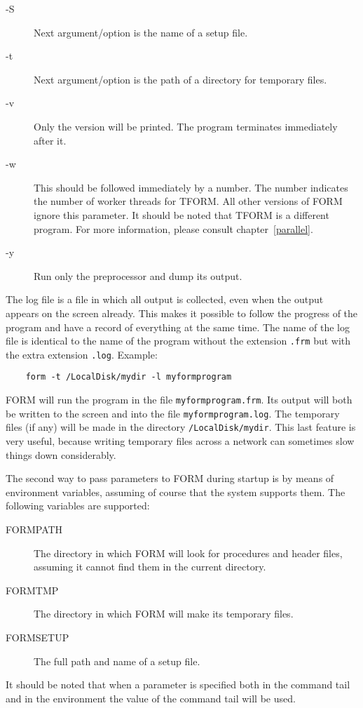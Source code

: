 \begin{description}
\item[-S] Next argument/option is the name of a setup file.
\item[-t] Next argument/option is the path of a directory for temporary files.
\item[-v] Only the version will be printed. The program terminates 
     immediately after it.
\item[-w] This should be followed immediately by a number. The 
     number indicates the number of worker threads for TFORM. All other 
     versions of FORM ignore this parameter. It should be noted that TFORM 
     is a different program. For more information, please consult 
     chapter~\ref{parallel}.
\item[-y] Run only the preprocessor and dump its output.
\end{description}

\noindent The log file is a file in which all 
output is collected, even when the output appears on the screen already. 
This makes it possible to follow the progress of the program and have a 
record of everything at the same time. The name of the log file is 
identical to the name of the program without the extension \verb:.frm: but 
with the extra extension \verb:.log:.
Example:
\begin{center}
\begin{verbatim}
	form -t /LocalDisk/mydir -l myformprogram
\end{verbatim}
\end{center}
FORM will run the program in the file \verb:myformprogram.frm:. Its output 
will both be written to the screen and into the file 
\verb:myformprogram.log:. The temporary files (if any) will be made in the 
directory \verb:/LocalDisk/mydir:. This last feature is very useful, 
because writing temporary files across a network can sometimes slow things 
down considerably.

The second way to pass parameters to FORM during startup is by means of 
environment variables, assuming of course that 
the system supports them. The following variables are supported:
\begin{description}
\item[FORMPATH] The directory in which FORM will look for 
procedures and header files, assuming it cannot find them in the current 
directory.
\item[FORMTMP] The directory in which FORM will make its 
temporary files.
\item[FORMSETUP] The full path and name of a setup 
file.
\end{description}
It should be noted that when a parameter is specified both in the command 
tail and in the environment the value of the command tail will be used.


